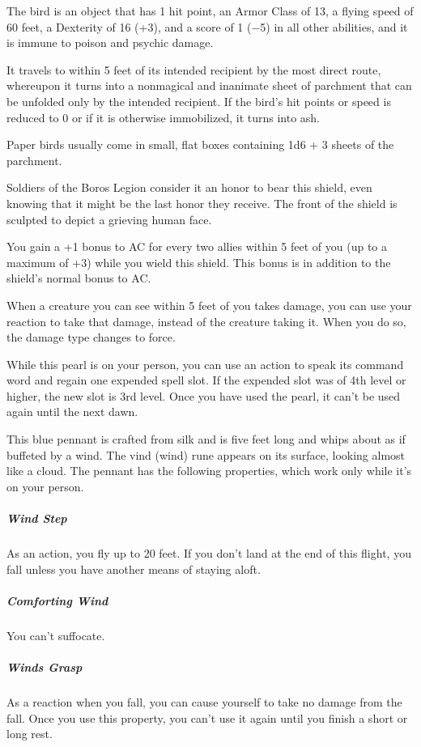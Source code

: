 \documentclass[10pt,a4paper,twoside,bg=print,twocolumn,openany,nodeprecatedcode]{dndbook}
\begin{document}
The bird is an object that has 1 hit point, an Armor Class of 13, a flying speed of 60 feet, a Dexterity of 16 (+3), and a score of 1 (−5) in all other abilities, and it is immune to poison and psychic damage.

It travels to within 5 feet of its intended recipient by the most direct route, whereupon it turns into a nonmagical and inanimate sheet of parchment that can be unfolded only by the intended recipient. If the bird's hit points or speed is reduced to 0 or if it is otherwise immobilized, it turns into ash.

Paper birds usually come in small, flat boxes containing 1d6 + 3 sheets of the parchment.

Soldiers of the Boros Legion consider it an honor to bear this shield, even knowing that it might be the last honor they receive. The front of the shield is sculpted to depict a grieving human face.

You gain a +1 bonus to AC for every two allies within 5 feet of you (up to a maximum of +3) while you wield this shield. This bonus is in addition to the shield's normal bonus to AC.

When a creature you can see within 5 feet of you takes damage, you can use your reaction to take that damage, instead of the creature taking it. When you do so, the damage type changes to force.

While this pearl is on your person, you can use an action to speak its command word and regain one expended spell slot. If the expended slot was of 4th level or higher, the new slot is 3rd level. Once you have used the pearl, it can't be used again until the next dawn.

This blue pennant is crafted from silk and is five feet long and whips about as if buffeted by a wind. The vind (wind) rune appears on its surface, looking almost like a cloud. The pennant has the following properties, which work only while it's on your person.

\subparagraph{Wind Step}
As an action, you fly up to 20 feet. If you don't land at the end of this flight, you fall unless you have another means of staying aloft.

\subparagraph{Comforting Wind}
You can't suffocate.

\subparagraph{Winds Grasp}
As a reaction when you fall, you can cause yourself to take no damage from the fall. Once you use this property, you can't use it again until you finish a short or long rest.
\end{document}

